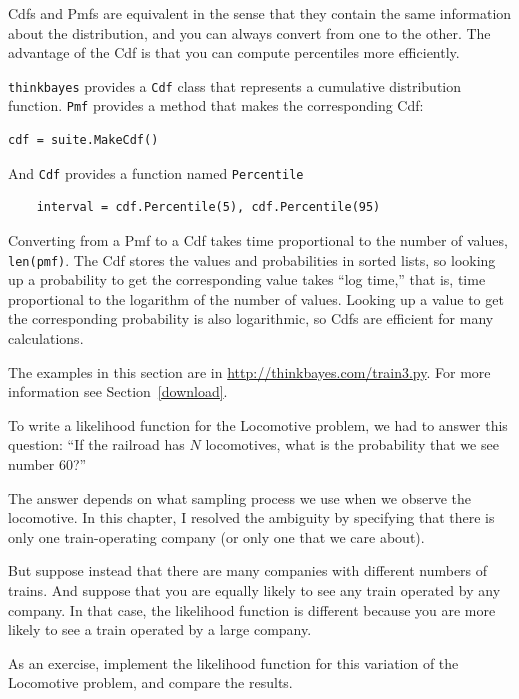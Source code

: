 \documentclass[12pt]{book}
\begin{document}
Cdfs and Pmfs are equivalent in the sense that they contain the
same information about the distribution, and you can always convert
from one to the other.  The advantage of the Cdf is that you can
compute percentiles more efficiently.

{\tt thinkbayes} provides a {\tt Cdf} class that represents a
cumulative distribution function.  {\tt Pmf} provides a method
that makes the corresponding Cdf:

\begin{verbatim}
cdf = suite.MakeCdf()
\end{verbatim}

And {\tt Cdf} provides a function named \verb"Percentile"

\begin{verbatim}
    interval = cdf.Percentile(5), cdf.Percentile(95)
\end{verbatim}

Converting from a Pmf to a Cdf takes time proportional to the number
of values, {\tt len(pmf)}.  The Cdf stores the values and
probabilities in sorted lists, so looking up a probability to get the
corresponding value takes ``log time,'' that is, time proportional to
the logarithm of the number of values.  Looking up a value to get the
corresponding probability is also logarithmic, so Cdfs are efficient
for many calculations.

The examples in this section are in \url{http://thinkbayes.com/train3.py}.
  For more information
see Section~\ref{download}.

\begin{exercise}
To write a likelihood function for the Locomotive problem, we had
to answer this question:  ``If the railroad has $N$ locomotives, what
is the probability that we see number 60?''

The answer depends on what sampling process we use when we observe the
locomotive.  In this chapter, I resolved the ambiguity by specifying
that there is only one train-operating company (or only one that we
care about).

But suppose instead that there are many companies with different
numbers of trains.  And suppose that you are equally likely to see any
train operated by any company.
In that case, the likelihood function is different because you
are more likely to see a train operated by a large company.

As an exercise, implement the likelihood function for this variation
of the Locomotive problem, and compare the results.

\end{exercise}
\end{document}
